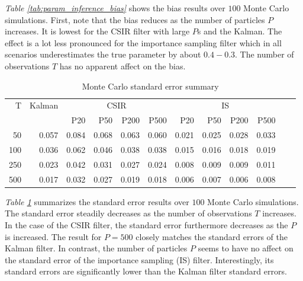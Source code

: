 \documentclass[11pt, oneside]{scrreprt}   	%
\begin{document}
\textit{Table \ref{tab:param_inference_bias}} shows the bias results over $100$ Monte Carlo simulations. First, note that the bias reduces as the number of particles $P$ increases. It is lowest for the CSIR filter with large $P$s and the Kalman. The effect is a lot less pronounced for the importance sampling filter which in all scenarios underestimates the true parameter by about $0.4-0.3$. The number of observations $T$ has no apparent affect on the bias.\\

\begin{table}[h!]
\centering
\begin{tabular}{rrrrrrrrrrrr}
\hline
T  & Kalman &  \multicolumn{4}{c}{CSIR} &  \multicolumn{4}{c}{IS}\\
\cline{3-10}
& & P20 & P50 & P200 & P500 & P20 & P50 & P200 & P500\\
\hline
50        & 0.057 & 0.084 & 0.068 & 0.063 & 0.060 & 0.021 & 0.025 & 0.028 & 0.033\\
100      & 0.036 & 0.062 & 0.046 & 0.038 & 0.038 & 0.015 & 0.016 & 0.018 & 0.019\\
250      & 0.023 & 0.042 & 0.031 & 0.027 & 0.024 & 0.008 & 0.009 & 0.009 & 0.011\\
500      & 0.017 & 0.032 & 0.027 & 0.019 & 0.018 & 0.006 & 0.007 & 0.006 & 0.008\\
\hline
\end{tabular}
\caption{Monte Carlo standard error summary}
\label{tab:param_inference_se}
\end{table}

\textit{Table \ref{tab:param_inference_se}} summarizes the standard error results over $100$ Monte Carlo simulations. The standard error steadily decreases as the number of observations $T$ increases. In the case of the CSIR filter, the standard error furthermore decreases as the $P$ is increased. The result for $P=500$ closely matches the standard errors of the Kalman filter. In contrast, the number of particles $P$ seems to have no affect on the standard error of the importance sampling (IS) filter. Interestingly, its standard errors are significantly lower than the Kalman filter standard errors.\\
\end{document}
